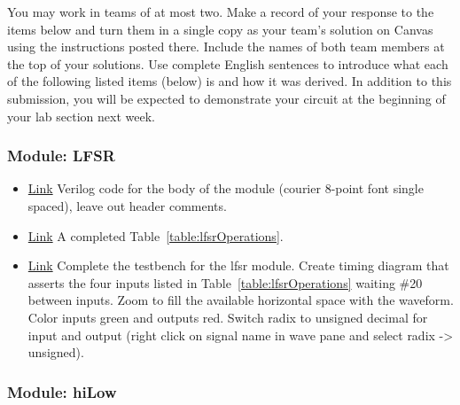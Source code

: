 You may work in teams of at most two. Make a record of your response to
the items below and turn them in a single copy as your team's solution
on Canvas using the instructions posted there. Include the names of both
team members at the top of your solutions. Use complete English
sentences to introduce what each of the following listed items (below)
is and how it was derived. In addition to this submission, you will be
expected to demonstrate your circuit at the beginning of your lab
section next week.

\subsubsection{Module: LFSR }
\begin{itemize}
\item
  \protect\hyperlink{lfsr_verilog}{Link} Verilog code for the body of
  the module (courier 8-point font single spaced), leave out header
  comments.
\item
  \protect\hyperlink{_Ref31885470}{Link} A completed Table~\ref{table:lfsrOperations}.
\item
  \protect\hyperlink{lfsr_testbench}{Link} Complete the testbench for
  the lfsr module. Create timing diagram that asserts the four inputs
  listed in Table~\ref{table:lfsrOperations} waiting \#20 between inputs. Zoom to fill the
  available horizontal space with the waveform. Color inputs green and
  outputs red. Switch radix to unsigned decimal for input and output
  (right click on signal name in wave pane and select radix
  -\textgreater{} unsigned).
\end{itemize}

\subsubsection{Module: hiLow}


